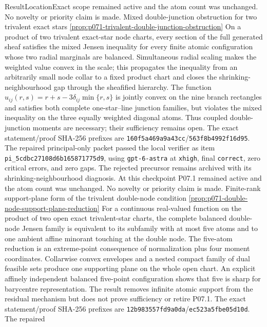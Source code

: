 \begin{AppLProvenanceLedger}{Result}{Location}{Exact scope}
{   remained active and the atom count was unchanged. No novelty or priority
   claim is made.}
\AppLProvenanceRecord
  {Mixed double-junction obstruction for two trivalent exact stars}
  {\cref{prop:p071-trivalent-double-junction-obstruction}}
  {On a product of two trivalent exact-star node charts, every section of
   the full generated sheaf satisfies the mixed Jensen inequality for every
   finite atomic configuration whose two radial marginals are balanced.
   Simultaneous radial scaling makes the weighted value convex in the scale;
   this propagates the inequality from an arbitrarily small node collar to a
   fixed product chart and closes the shrinking-neighbourhood gap through
   the sheafified hierarchy.  The function
   \(u_{ij}(r,s)=r+s-3\delta_{ij}\min\{r,s\}\) is jointly convex on the nine
   branch rectangles and satisfies both complete one-star--line junction
   families, but violates the mixed inequality on the three equally
   weighted diagonal atoms.  Thus coupled double-junction moments are
   necessary; their sufficiency remains open.  The exact statement/proof
   SHA-256 prefixes are
   \texttt{160f5a469a9a43cc}/\texttt{563f8b4992f16d95}.  The repaired
   principal-only packet passed the local verifier as item
   \nolinkurl{pi_5cdbc27108d6b165871775d9}, using
   \texttt{gpt-6-astra} at \texttt{xhigh}, final \texttt{correct}, zero
   critical errors, and zero gaps.  The rejected precursor remains archived
   with its shrinking-neighbourhood diagnosis. At this checkpoint P07.1
   remained active and the atom count was unchanged. No novelty or priority
   claim is made.}
\AppLProvenanceRecord
  {Finite-rank support-plane form of the trivalent double-node condition}
  {\cref{prop:p071-double-node-support-plane-reduction}}
  {For a continuous real-valued function on the product of two open exact
   trivalent-star charts, the complete balanced double-node Jensen family
   is equivalent to its subfamily with at most five atoms and to one
   ambient affine minorant touching at the double node.  The five-atom
   reduction is an extreme-point consequence of normalization plus four
   moment coordinates.  Collarwise convex envelopes and a nested compact
   family of dual feasible sets produce one supporting plane on the whole
   open chart.  An explicit affinely independent balanced five-point
   configuration shows that five is sharp for barycentre representation.
   The result removes infinite atomic support from the residual mechanism
   but does not prove sufficiency or retire P07.1.  The exact
   statement/proof SHA-256 prefixes are
   \texttt{12b983557fd9a0da}/\texttt{ec523a5fbe05d10d}.  The repaired
}
\end{AppLProvenanceLedger}
